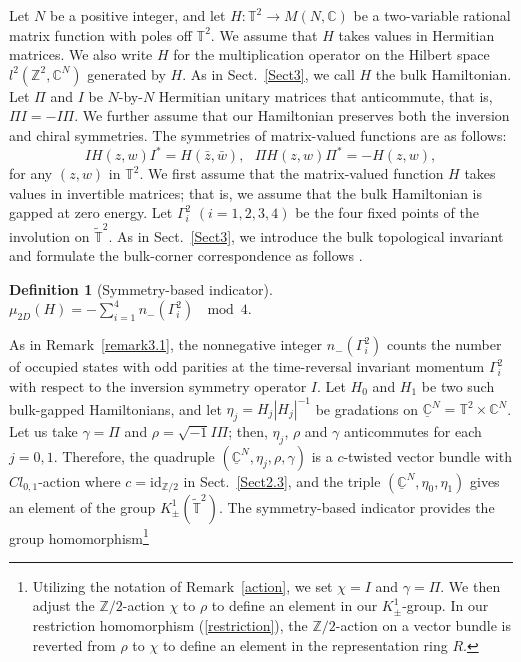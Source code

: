 \documentclass{amsart}
\theoremstyle{plain}
\theoremstyle{definition}
\newtheorem{definition}[theorem]{Definition}
\theoremstyle{remark}
\newcommand{\Z}{\mathbb{Z}}
\newcommand{\C}{\mathbb{C}}
\newcommand{\T}{\mathbb{T}}
\newcommand{\id}{\mathrm{id}}
\newcommand{\tT}{\widetilde{\T}}
\newcommand{\uC}{\underline{\C}}
\begin{document}
Let $N$ be a positive integer, and
let $H \colon \T^2 \to M(N, \C)$ be a two-variable rational matrix function with poles off $\T^2$.
We assume that $H$ takes values in Hermitian matrices.
We also write $H$ for the multiplication operator on the Hilbert space $l^2(\Z^2, \C^N)$ generated by $H$.
As in Sect.~\ref{Sect3}, we call $H$ the bulk Hamiltonian.
Let $\Pi$ and $I$ be $N$-by-$N$ Hermitian unitary matrices that anticommute, that is, $\Pi I = - I \Pi$.
We further assume that our Hamiltonian preserves both the inversion and chiral symmetries.
The symmetries of matrix-valued functions are as follows:
\begin{equation*}
	I H(z, w) I^* = H(\bar{z}, \bar{w}), \ \ \ \Pi H(z, w) \Pi^* = - H(z, w),
\end{equation*}
for any $(z,w)$ in $\T^2$.
We first assume that the matrix-valued function $H$ takes values in invertible matrices; that is, we assume that the bulk Hamiltonian is gapped at zero energy.
Let $\Gamma^2_i$ $(i=1,2,3,4)$ be the four fixed points of the involution on $\tT^2$.
As in Sect.~\ref{Sect3}, we introduce the bulk topological invariant and formulate the bulk-corner correspondence as follows \cite{TTM20a,OTY21,SO21}.
\begin{definition}[Symmetry-based indicator]
\label{mu2D}
$\mu_{2D}(H) = - \sum_{i=1}^4 n_-(\Gamma^2_i) \ \mod 4$.
\end{definition}
As in Remark~\ref{remark3.1}, the nonnegative integer $n_-(\Gamma^2_i)$ counts the number of occupied states with odd parities at the time-reversal invariant momentum $\Gamma^2_i$ with respect to the inversion symmetry operator $I$.
Let $H_0$ and $H_1$ be two such bulk-gapped Hamiltonians, and let $\eta_j = H_j |H_j|^{-1}$ be gradations on $\uC^N = \T^2 \times \C^N$.
Let us take $\gamma = \Pi$ and $\rho = \sqrt{-1}I \Pi$; then, $\eta_j$, $\rho$ and $\gamma$ anticommutes for each $j=0,1$.
Therefore, the quadruple $(\uC^N, \eta_j, \rho, \gamma)$ is a $c$-twisted vector bundle with $Cl_{0,1}$-action where $c = \id_{\Z/2}$ in Sect.~\ref{Sect2.3}, and the triple $(\uC^N, \eta_0, \eta_1)$ gives an element of the group $K^1_\pm(\tT^2)$.
The symmetry-based indicator provides the group homomorphism\footnote{Utilizing the notation of Remark~\ref{action}, we set $\chi = I$ and $\gamma = \Pi$. We then adjust the $\Z/2$-action $\chi$ to $\rho$ to define an element in our $K^1_\pm$-group.
In our restriction homomorphism (\ref{restriction}), the $\Z/2$-action on a vector bundle is reverted from $\rho$ to $\chi$ to define an element in the representation ring $R$.}
\end{document}
